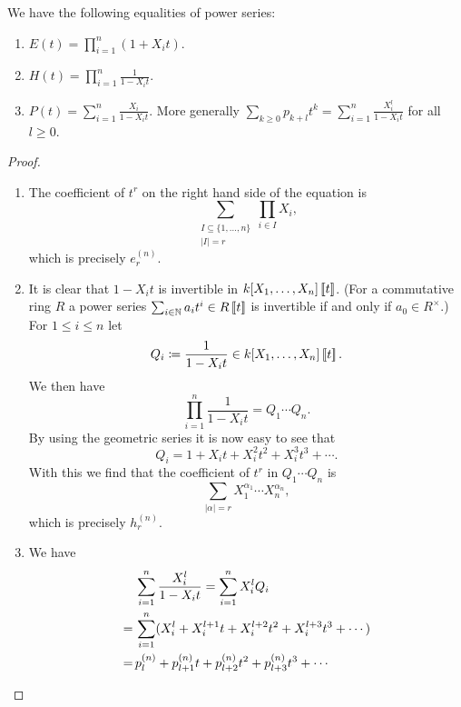 \begin{prop}
  We have the following equalities of power series:
  \begin{enumerate}[label=\emph{\alph*)},leftmargin=*]
    \item
      $E(t) = \prod_{i=1}^n (1 + X_i t)$.
    \item
      $H(t) = \prod_{i=1}^n \frac{1}{1 - X_i t}$.
    \item
      $P(t) = \sum_{i=1}^n \frac{X_i}{1 - X_i t}$.
      More generally $\sum_{k \geq 0} p_{k+l} t^k = \sum_{i=1}^n \frac{X_i^l}{1 - X_i t}$ for all $l \geq 0$.
  \end{enumerate}
\end{prop}
\begin{proof}
  \begin{enumerate}[label=\emph{\alph*)},leftmargin=*]
    \item
      The coefficient of $t^r$ on the right hand side of the equation is
      \[
        \sum_{\substack{I \subseteq \{1, \dotsc, n\} \\ |I| = r}} \prod_{i \in I} X_i,
      \]
      which is precisely $e^{(n)}_r$.
    \item
      It is clear that $1-X_i t$ is invertible in $k[X_1, \dotsc, X_n]\left[\!\left[t\right]\!\right]$.
      (For a commutative ring $R$ a power series $\sum_{i \in \mathbb{N}} a_i t^i \in R\left[\!\left[t\right]\!\right]$ is invertible if and only if $a_0 \in R^\times$.)
      For $1 \leq i \leq n$ let
      \[
                  Q_i
        \coloneqq \frac{1}{1-X_i t} \in k[X_1, \dotsc, X_n] \left[\!\left[t\right]\!\right].
      \]
      We then have
      \[
          \prod_{i=1}^n \frac{1}{1-X_i t}
        = Q_1 \dotsm Q_n.
      \]
      By using the geometric series it is now easy to see that
      \[
          Q_i
        = 1 + X_i t + X_i^2 t^2 + X_i^3 t^3 + \dotsb.
      \]
      With this we find that the coefficient of $t^r$ in $Q_1 \dotsm Q_n$ is
      \[
        \sum_{|\alpha| = r} X_1^{\alpha_1} \dotsm X_n^{\alpha_n},
      \]
      which is precisely $h^{(n)}_r$.
    \item
      We have
      \begin{align*}
         &\, \sum_{i=1}^n \frac{X_i^l}{1-X_i t}
        =    \sum_{i=1}^n X_i^l Q_i \\
        =&\, \sum_{i=1}^n (X_i^l + X_i^{l+1} t + X_i^{l+2} t^2 + X_i^{l+3} t^3 + \dotsb) \\
        =&\, p^{(n)}_l + p^{(n)}_{l+1} t + p^{(n)}_{l+2} t^2 + p^{(n)}_{l+3} t^3 + \dotsb
        \qedhere
      \end{align*}
  \end{enumerate}
\end{proof}



